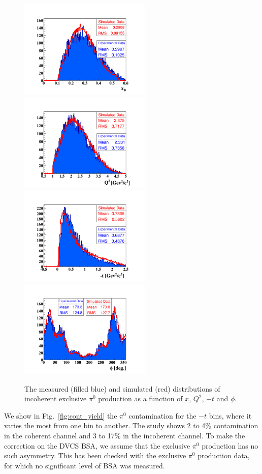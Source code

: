 \documentclass{article}
\begin{document}
\begin{figure}[p]
\center
\includegraphics[trim=70 15 70 70,clip,width=6.3cm]{fig3/pi0/xB_InCoh_pi0.png}
\includegraphics[trim=70 15 70 70,clip,width=6.3cm]{fig3/pi0/Q2_InCoh_pi0.png}
\includegraphics[trim=70 15 70 70,clip,width=6.3cm]{fig3/pi0/t_InCoh_pi0.png}
\includegraphics[trim=70 15 70 70,clip,width=6.3cm]{fig3/pi0/phi_h_InCoh_pi0.png}
	\caption{The measured (filled blue) and simulated (red) distributions of
	incoherent exclusive $\pi^0$ production as a function of $x$, $Q^2$, $-t$ and $\phi$.}
\label{fig:InCohPi0Simul}
\end{figure}


We show in Fig.~\ref{fig:cont_yield} the $\pi^0$ contamination for the $-t$ bins, where it varies
the most from one bin to another. The study
shows 2 to 4\% contamination in the coherent channel and 3 to 17\% in the incoherent
channel. To make the correction on the DVCS BSA, we assume that
the exclusive $\pi^0$ production has no such asymmetry. This has been checked with the exclusive 
$\pi^0$ production data, for which no significant level of BSA was measured.
\end{document}
